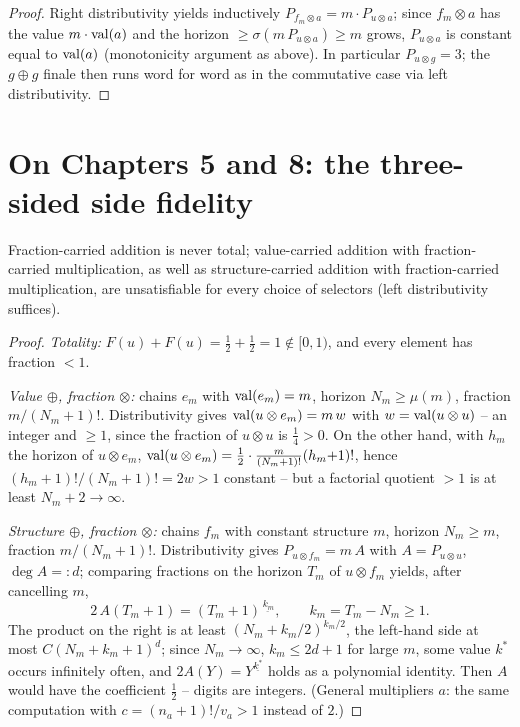 \begin{proof}
Right distributivity yields inductively
$P_{f_m\otimes a}=m\cdot P_{u\otimes a}$; since $f_m\otimes a$ has
the value $m\cdot\operatorname{val}(a)$ and the horizon
$\ge\sigma(m\,P_{u\otimes a})\ge m$ grows, $P_{u\otimes a}$ is
constant equal to $\operatorname{val}(a)$ (monotonicity argument as above).
In particular $P_{u\otimes g}=3$; the $g\oplus g$ finale then runs
word for word as in the commutative case via left distributivity.
\end{proof}

\section*{On Chapters 5 and 8: the three-sided side fidelity}

\begin{satz}[trilogy]
Fraction-carried addition is never total; value-carried addition
with fraction-carried multiplication, as well as
structure-carried addition with fraction-carried multiplication,
are unsatisfiable for every choice of selectors (left
distributivity suffices).
\end{satz}

\begin{proof}
\emph{Totality:} $F(u)+F(u)=\tfrac12+\tfrac12=1\notin[0,1)$, and
every element has fraction $<1$.

\emph{Value $\oplus$, fraction $\otimes$:} chains $e_m$ with
$\operatorname{val}(e_m)=m$, horizon $N_m\ge\mu(m)$, fraction $m/(N_m{+}1)!$.
Distributivity gives $\operatorname{val}(u\otimes e_m)=m\,w$ with
$w=\operatorname{val}(u\otimes u)$ -- an integer and $\ge1$, since the fraction
of $u\otimes u$ is $\tfrac14>0$. On the other hand, with $h_m$ the
horizon of $u\otimes e_m$,
$\operatorname{val}(u\otimes e_m)=\tfrac12\cdot\frac{m}{(N_m+1)!}(h_m{+}1)!$,
hence $(h_m{+}1)!/(N_m{+}1)!=2w>1$ constant -- but a
factorial quotient $>1$ is at least $N_m{+}2\to\infty$.

\emph{Structure $\oplus$, fraction $\otimes$:} chains $f_m$ with
constant structure $m$, horizon $N_m\ge m$, fraction
$m/(N_m{+}1)!$. Distributivity gives $P_{u\otimes f_m}=m\,A$ with
$A=P_{u\otimes u}$, $\deg A=:d$; comparing fractions on the
horizon $T_m$ of $u\otimes f_m$ yields, after cancelling $m$,
\[
2\,A(T_m{+}1)=(T_m{+}1)^{\underline{\,k_m}},\qquad
k_m=T_m-N_m\ge1 .
\]
The product on the right is at least $(N_m+k_m/2)^{k_m/2}$, the
left-hand side at most $C(N_m{+}k_m{+}1)^d$; since $N_m\to\infty$,
$k_m\le2d{+}1$ for large $m$, some value $k^*$ occurs infinitely
often, and $2A(Y)=Y^{\underline{k^*}}$ holds as a polynomial
identity. Then $A$ would have the coefficient $\tfrac12$ --
digits are integers. (General multipliers $a$: the same
computation with $c=(n_a{+}1)!/v_a>1$ instead of $2$.)
\end{proof}

